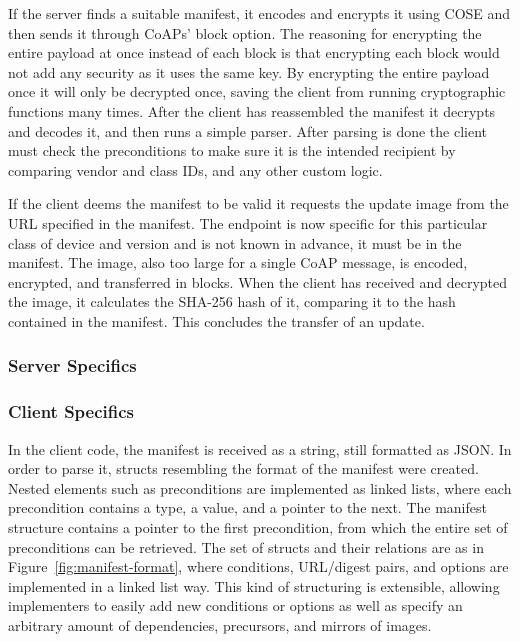 \documentclass[0-thesis.tex]{subfiles}
\begin{document}
If the server finds a suitable manifest, it encodes and encrypts it using COSE and then
sends it through CoAPs' block option. The reasoning for encrypting the entire payload at
once instead of each block is that encrypting each block would not add any security as it
uses the same key. By encrypting the entire payload once it will only be decrypted once,
saving the client from running cryptographic functions many times. After the client has
reassembled the manifest it decrypts and decodes it, and then runs a simple parser. After
parsing is done the client must check the preconditions to make sure it is the intended
recipient by comparing vendor and class IDs, and any other custom logic.

If the client deems the manifest to be valid it requests the update image from the URL
specified in the manifest. The endpoint is now specific for this particular class of
device and version and is not known in advance, it must be in the manifest. The image,
also too large for a single CoAP message, is encoded, encrypted, and transferred in
blocks. When the client has received and decrypted the image, it calculates the SHA-256
hash of it, comparing it to the hash contained in the manifest. This concludes the
transfer of an update.

\subsubsection{Server Specifics}
\label{sssec:server-specifics}

\subsubsection{Client Specifics}
\label{sssec:client-specifics}
In the client code, the manifest is received as a string, still formatted as JSON. In
order to parse it, structs resembling the format of the manifest were created. Nested
elements such as preconditions are implemented as linked lists, where each precondition
contains a type, a value, and a pointer to the next. The manifest structure contains a
pointer to the first precondition, from which the entire set of preconditions can be
retrieved. The set of structs and their relations are as in
Figure~\ref{fig:manifest-format}, where conditions, URL/digest pairs, and options are
implemented in a linked list way. This kind of structuring is extensible, allowing
implementers to easily add new conditions or options as well as specify an arbitrary
amount of dependencies, precursors, and mirrors of images.
\end{document}
